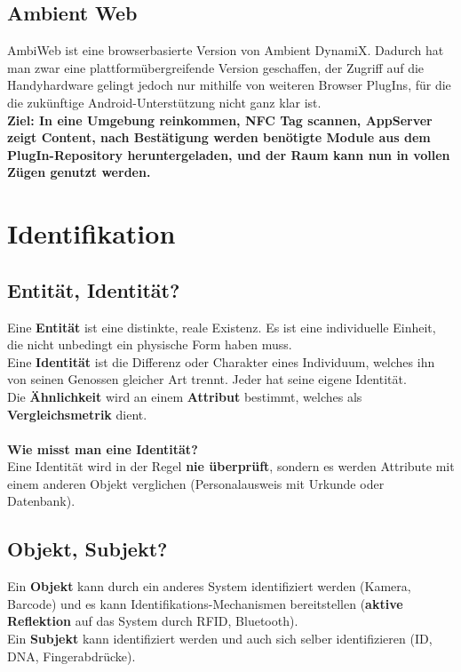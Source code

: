 \documentclass[a4paper]{article}
\begin{document}
\subsection{Ambient Web}
AmbiWeb ist eine browserbasierte Version von Ambient DynamiX. Dadurch hat man zwar eine plattformübergreifende Version geschaffen, der Zugriff auf die Handyhardware gelingt jedoch nur mithilfe von weiteren Browser PlugIns, für die die zukünftige Android-Unterstützung nicht ganz klar ist.\\

\textbf{Ziel: In eine Umgebung reinkommen, NFC Tag scannen, AppServer zeigt Content, nach Bestätigung werden benötigte Module aus dem PlugIn-Repository heruntergeladen, und der Raum kann nun in vollen Zügen genutzt werden.}

\newpage
\section{Identifikation}
\subsection{Entität, Identität?}
Eine \textbf{Entität} ist eine distinkte, reale Existenz. Es ist eine individuelle Einheit, die nicht unbedingt ein physische Form haben muss.\\
Eine \textbf{Identität} ist die Differenz oder Charakter eines Individuum, welches ihn von seinen Genossen gleicher Art trennt. Jeder hat seine eigene Identität.\\
Die \textbf{Ähnlichkeit} wird an einem \textbf{Attribut} bestimmt, welches als \textbf{Vergleichsmetrik} dient.\\
\\
\textbf{Wie misst man eine Identität?}\\

Eine Identität wird in der Regel \textbf{nie überprüft}, sondern es werden Attribute mit einem anderen Objekt verglichen (Personalausweis mit Urkunde oder Datenbank).
\subsection{Objekt, Subjekt?}
Ein \textbf{Objekt} kann durch ein anderes System identifiziert werden (Kamera, Barcode) und es kann Identifikations-Mechanismen bereitstellen (\textbf{aktive Reflektion} auf das System durch RFID, Bluetooth).\\
Ein \textbf{Subjekt} kann identifiziert werden und auch sich selber identifizieren (ID, DNA, Fingerabdrücke).
\end{document}
